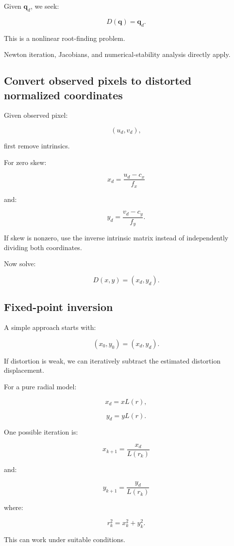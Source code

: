Given \(\mathbf q_d\), we seek:

\[
 \boxed{ D(\mathbf q)=\mathbf q_d }.
\]

This is a nonlinear root-finding problem.

Newton iteration, Jacobians, and numerical-stability analysis directly apply.

\subsection{Convert observed pixels to distorted normalized coordinates}\label{02-foundations-ii-ch035-convert-observed-pixels-to-distorted-normalized-coordinates}

Given observed pixel:

\[
 (u_d,v_d),
\]

first remove intrinsics.

For zero skew:

\[
 \boxed{ x_d=\frac{u_d-c_x}{f_x} }
\]

and:

\[
 \boxed{ y_d=\frac{v_d-c_y}{f_y} }.
\]

If skew is nonzero, use the inverse intrinsic matrix instead of independently dividing both coordinates.

Now solve:

\[
 D(x,y)=(x_d,y_d).
\]

\subsection{Fixed-point inversion}\label{02-foundations-ii-ch035-fixed-point-inversion}

A simple approach starts with:

\[
 \boxed{ (x_0,y_0)=(x_d,y_d) }.
\]

If distortion is weak, we can iteratively subtract the estimated distortion displacement.

For a pure radial model:

\[
 x_d=xL(r),
\]

\[
 y_d=yL(r).
\]

One possible iteration is:

\[
 \boxed{ x_{k+1}=\frac{x_d}{L(r_k)} }
\]

and:

\[
 \boxed{ y_{k+1}=\frac{y_d}{L(r_k)} }
\]

where:

\[
 r_k^2=x_k^2+y_k^2.
\]

This can work under suitable conditions.

